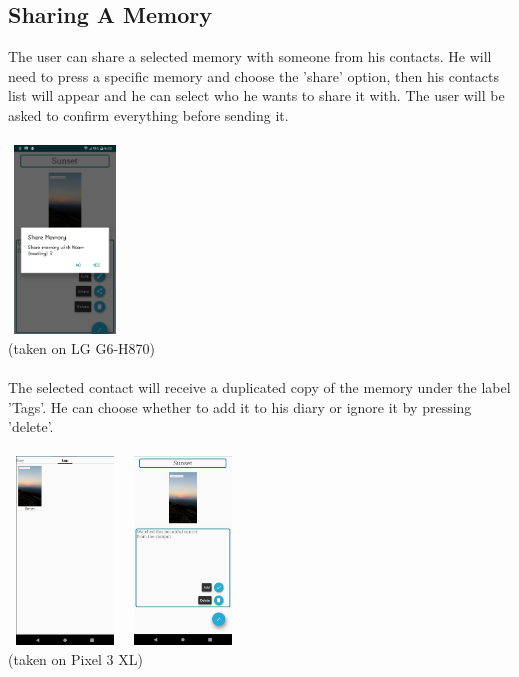 \documentclass{article}
\begin{document}
\subsection{Sharing A Memory}
The user can share a selected memory with someone from his contacts. He will need to press a specific memory and choose the 'share' option, then his contacts list will appear and he can select who he wants to share it with. The user will be asked to confirm everything before sending it.
\\\\
\includegraphics[width=3cm, height=5cm]{shareMemo}\\
{\small(taken on LG G6-H870)}
\\\\
The selected contact will receive a duplicated copy of the memory under the label 'Tags'. He can choose whether to add it to his diary or ignore it by pressing 'delete'.
\\\\
\includegraphics[width=3cm, height=5cm]{sharedMemo1}\quad
\includegraphics[width=3cm, height=5cm]{sharedMemo2}\\
{\small(taken on Pixel 3 XL)}
\\\\
\end{document}

